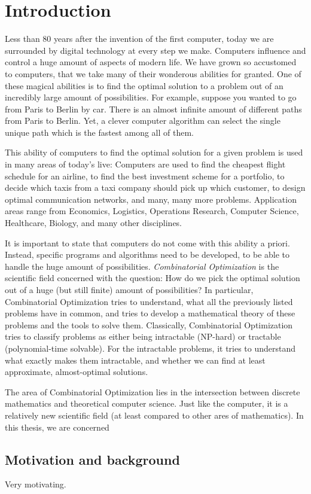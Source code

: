 \chapter{Introduction}
Less than 80 years after the invention of the first computer, today we are surrounded by digital technology at every step we make. 
Computers influence and control a huge amount of aspects of modern life. 
We have grown so accustomed to computers, that we take many of their wonderous abilities for granted. 
One of these magical abilities is to find the optimal solution to a problem out of an incredibly large amount of possibilities.
For example, suppose you wanted to go from Paris to Berlin by car. There is an almost infinite amount of different paths from Paris to Berlin. Yet, a clever computer algorithm can select the single unique path which is the fastest among all of them.

This ability of computers to find the optimal solution for a given problem is used in many areas of today's live: Computers are used to find the cheapest flight schedule for an airline, to find the best investment scheme for a portfolio, to decide which taxis from a taxi company should pick up which customer, to design optimal communication networks, and many, many more problems. Application areas range from Economics, Logistics, Operations Research, Computer Science, Healthcare, Biology, and many other disciplines.

It is important to state that computers do not come with this ability a priori. Instead, specific programs and algorithms need to be developed, to be able to handle the huge amount of possibilities. 
\emph{Combinatorial Optimization} is the scientific field concerned with the question: How do we pick the optimal solution out of a huge (but still finite) amount of possibilities? 
In particular, Combinatorial Optimization tries to understand, what all the previously listed problems have in common, and tries to develop a mathematical theory of these problems and the tools to solve them. Classically, Combinatorial Optimization tries to classify problems as either being intractable (NP-hard) or tractable (polynomial-time solvable). For the intractable problems, it tries to understand what exactly makes them intractable, and whether we can find at least approximate, almost-optimal solutions.

The area of Combinatorial Optimization lies in the intersection between discrete mathematics and theoretical computer science. 
Just like the computer, it is a relatively new scientific field (at least compared to other ares of mathematics). In this thesis, we are concerned 

\section{Motivation and background}
Very motivating.
